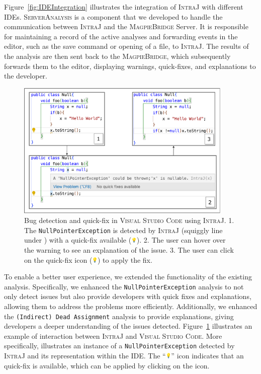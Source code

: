 Figure~\ref{fig:IDEIntegration} illustrates the integration of \textsc{IntraJ} with
different IDEs. \textsc{ServerAnalysis} is a component that we developed to handle the
communication between \textsc{IntraJ} and the \textsc{MagpieBridge} Server. It is responsible
for maintaining a record of the active analyses and forwarding events in the editor,
such as the save command or opening of a file, to \textsc{IntraJ}.
The results of the analysis are then sent back to the \textsc{MagpieBridge}, which subsequently
forwards them to the editor, displaying warnings, quick-fixes, and explanations
to the developer.
\begin{figure}[ht]
  \centering
  \includegraphics[width=0.92\textwidth]{kappa/img/IDEExample.pdf}
  \caption{\label{fig:IDEExample} Bug detection and quick-fix in \textsc{Visual Studio Code} using \textsc{IntraJ}.
  1. The \texttt{NullPointerException} is detected by \textsc{IntraJ} (squiggly line under ) with a quick-fix available (\includegraphics[height=8pt]{kappa/img/bulb.png}).
  2. The user can hover over the warning to see an explanation of the issue.
  3. The user can click on the quick-fix icon (\includegraphics[height=8pt]{kappa/img/bulb.png}) to apply the fix.
  }
\end{figure}
To enable a better user experience, we extended the functionality of the existing analysis.
Specifically, we enhanced the \texttt{NullPointerException} analysis to not only detect issues
but also provide developers with quick fixes and explanations, allowing them to address
the problems more efficiently. Additionally, we enhanced the \texttt{(Indirect) Dead Assignment} analysis
to provide explanations, giving developers a deeper understanding of the issues detected.
Figure~\ref{fig:IDEExample} illustrates an example of interaction between \textsc{IntraJ} and
\textsc{Visual Studio Code}. More specifically, illustrates an instance of a \texttt{NullPointerException}
detected by \textsc{IntraJ} and its representation within the IDE.
The ``\includegraphics[height=8pt]{kappa/img/bulb.png}''  icon indicates that an quick-fix is available,
which can be applied by clicking on the icon.

